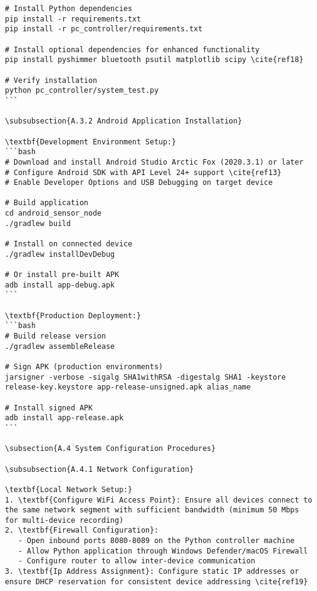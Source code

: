 \begin{verbatim}
# Install Python dependencies
pip install -r requirements.txt
pip install -r pc_controller/requirements.txt

# Install optional dependencies for enhanced functionality
pip install pyshimmer bluetooth psutil matplotlib scipy \cite{ref18}

# Verify installation
python pc_controller/system_test.py
```

\subsubsection{A.3.2 Android Application Installation}

\textbf{Development Environment Setup:}
```bash
# Download and install Android Studio Arctic Fox (2020.3.1) or later
# Configure Android SDK with API Level 24+ support \cite{ref13}
# Enable Developer Options and USB Debugging on target device

# Build application
cd android_sensor_node
./gradlew build

# Install on connected device
./gradlew installDevDebug

# Or install pre-built APK
adb install app-debug.apk
```

\textbf{Production Deployment:}
```bash
# Build release version
./gradlew assembleRelease

# Sign APK (production environments)
jarsigner -verbose -sigalg SHA1withRSA -digestalg SHA1 -keystore release-key.keystore app-release-unsigned.apk alias_name

# Install signed APK
adb install app-release.apk
```

\subsection{A.4 System Configuration Procedures}

\subsubsection{A.4.1 Network Configuration}

\textbf{Local Network Setup:}
1. \textbf{Configure WiFi Access Point}: Ensure all devices connect to the same network segment with sufficient bandwidth (minimum 50 Mbps for multi-device recording)
2. \textbf{Firewall Configuration}:
   - Open inbound ports 8080-8089 on the Python controller machine
   - Allow Python application through Windows Defender/macOS Firewall
   - Configure router to allow inter-device communication
3. \textbf{Ip Address Assignment}: Configure static IP addresses or ensure DHCP reservation for consistent device addressing \cite{ref19}


\end{verbatim}
